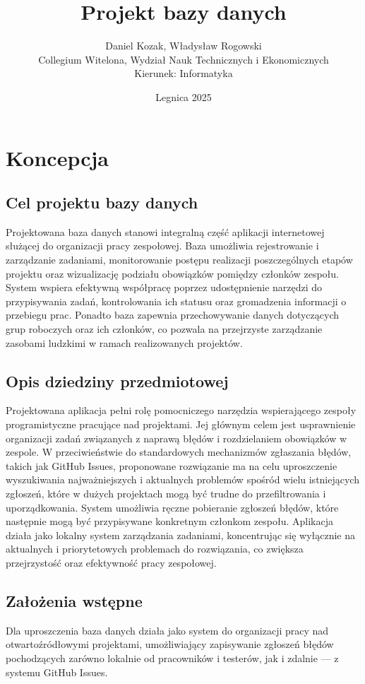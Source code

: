 \documentclass[a4paper,12pt]{article}
\title{\textbf{Projekt bazy danych}}
\author{Daniel Kozak, Władysław Rogowski \\
Collegium Witelona, Wydział Nauk Technicznych i Ekonomicznych \\
Kierunek: Informatyka}
\date{Legnica 2025}
\begin{document}
\maketitle

\tableofcontents
\newpage

\section{Koncepcja}

\subsection{Cel projektu bazy danych}
Projektowana baza danych stanowi integralną część aplikacji internetowej służącej do organizacji pracy zespołowej. Baza umożliwia rejestrowanie i zarządzanie zadaniami, monitorowanie postępu realizacji poszczególnych etapów projektu oraz wizualizację podziału obowiązków pomiędzy członków zespołu. System wspiera efektywną współpracę poprzez udostępnienie narzędzi do przypisywania zadań, kontrolowania ich statusu oraz gromadzenia informacji o przebiegu prac. Ponadto baza zapewnia przechowywanie danych dotyczących grup roboczych oraz ich członków, co pozwala na przejrzyste zarządzanie zasobami ludzkimi w ramach realizowanych projektów.

\subsection{Opis dziedziny przedmiotowej}
Projektowana aplikacja pełni rolę pomocniczego narzędzia wspierającego zespoły programistyczne pracujące nad projektami. Jej głównym celem jest usprawnienie organizacji zadań związanych z naprawą błędów i rozdzielaniem obowiązków w zespole. W przeciwieństwie do standardowych mechanizmów zgłaszania błędów, takich jak GitHub Issues, proponowane rozwiązanie ma na celu uproszczenie wyszukiwania najważniejszych i aktualnych problemów spośród wielu istniejących zgłoszeń, które w dużych projektach mogą być trudne do przefiltrowania i uporządkowania.
System umożliwia ręczne pobieranie zgłoszeń błędów, które następnie mogą być przypisywane konkretnym członkom zespołu. Aplikacja działa jako lokalny system zarządzania zadaniami, koncentrując się wyłącznie na aktualnych i priorytetowych problemach do rozwiązania, co zwiększa przejrzystość oraz efektywność pracy zespołowej.

\subsection{Założenia wstępne}
Dla uproszczenia baza danych działa jako system do organizacji pracy nad otwartoźródłowymi projektami, umożliwiający zapisywanie zgłoszeń błędów pochodzących zarówno lokalnie od pracowników i testerów, jak i zdalnie — z systemu GitHub Issues. 
\end{document}
